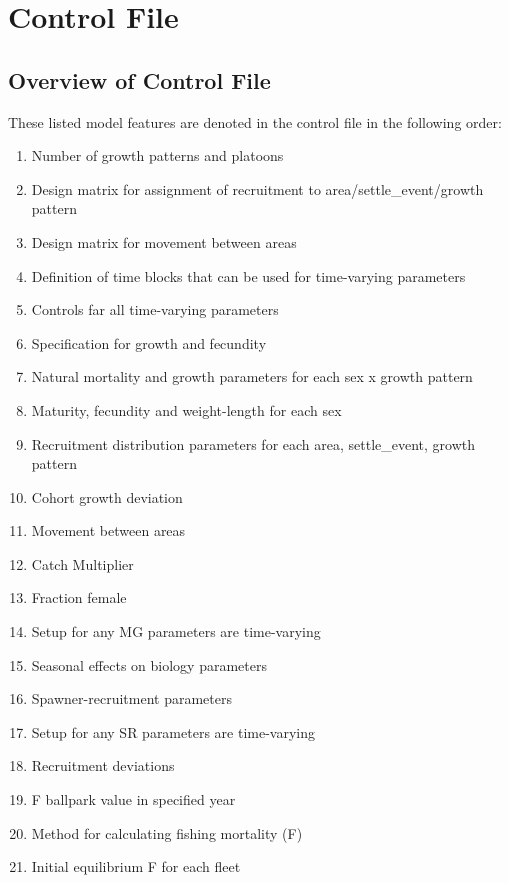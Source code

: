 \section{Control File}
\subsection{Overview of Control File}
These listed model features are denoted in the control file in the following order:
	\begin{enumerate}
		\item Number of growth patterns and platoons
		\item Design matrix for assignment of recruitment to area/settle\_event/growth pattern
		\item Design matrix for movement between areas
		\item Definition of time blocks that can be used for time-varying parameters
		\item Controls far all time-varying parameters
		\\
		\item Specification for growth and fecundity
		\item Natural mortality and growth parameters for each sex x growth pattern
		\item Maturity, fecundity and weight-length for each sex
		\item Recruitment distribution parameters for each area, settle\_event, growth pattern
		\item Cohort growth deviation
		\item Movement between areas
		\item Catch Multiplier
		\item Fraction female
		\item Setup for any MG parameters are time-varying
		\item Seasonal effects on biology parameters
		\\
		\item Spawner-recruitment parameters
		\item Setup for any SR parameters are time-varying
		\item Recruitment deviations
		\\
		\item F ballpark value in specified year
		\item Method for calculating fishing mortality (F)
		\item Initial equilibrium F for each fleet
		\\

\end{enumerate}
